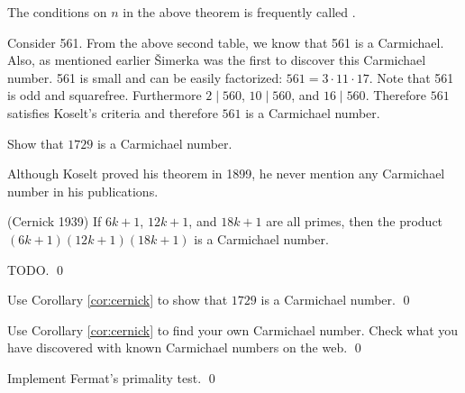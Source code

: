 The conditions on $n$ in the above theorem is frequently called
.

\begin{eg}
Consider 561.
From the above second table, we know that 561 is a Carmichael.
Also, as mentioned earlier \v{S}imerka was the first to discover this
Carmichael number.
561 is small and can be easily factorized: $561 = 3 \cdot 11 \cdot 17$.
Note that 561 is odd and squarefree.
Furthermore $2 \mid 560$, $10 \mid 560$, and $16 \mid 560$.
Therefore $561$ satisfies Koselt's criteria and therefore
$561$ is a Carmichael number.
\end{eg}

\begin{ex}
  Show that $1729$ is a Carmichael number.
\end{ex}

Although Koselt proved his theorem in 1899,
he never mention any Carmichael number in his publications.

\begin{cor} \textnormal{(Cernick 1939)}\label{cor:cernick}
  If $6k + 1$, $12k + 1$, and $18k + 1$ are all primes, then the product
  $(6k + 1)(12k + 1)(18k + 1)$ is a Carmichael number.
\end{cor}
\proof
TODO.
\qed

\begin{ex}
  Use Corollary \ref{cor:cernick} to show that $1729$ is a Carmichael number.
  \qed
\end{ex}

\begin{ex}
  Use Corollary \ref{cor:cernick} to find your own Carmichael number.
  Check what you have discovered with known Carmichael numbers on the web.
  \qed
\end{ex}

\begin{ex}
  Implement Fermat's primality test.
  \qed
\end{ex}
